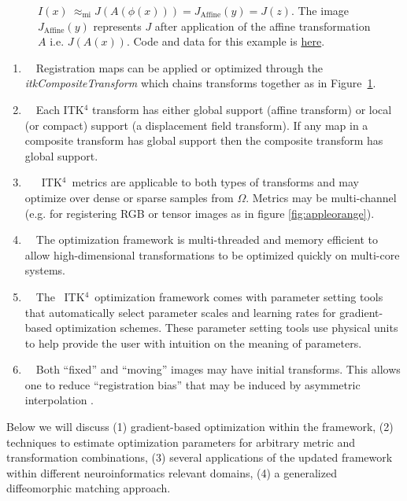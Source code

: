 \documentclass{frontiersSCNS}
\newcommand{\tk}{~ITK$^{\text{4}}$~}
\begin{document}
\begin{figure}[t]
\begin{center}
{  $I(x) ~\approx_\text{mi}  J(A(\phi(x))) =  J_\text{Affine}(y) = J(z)
  $. The image $J_\text{Affine}(y)$
  represents $J$ after application of the affine transformation $A$
  i.e. $J(A(x))$.  Code and data for this example is \href{http://stnava.github.io/cars/}{here}.}
\label{fig:composite}
\end{center}
\end{figure}
\begin{enumerate}
\item~~Registration maps can be applied or optimized through the {\em
    itkCompositeTransform} which chains transforms together as in Figure~\ref{fig:composite}.
\item~~Each ITK$^4$ transform has either global support (affine
  transform) or local (or compact) support (a displacement field transform).   If
  any map in a composite transform has global support then the
  composite transform has global support. 
\item~~\tk metrics are applicable to both types of transforms and may
  optimize over dense or sparse samples from $\Omega$.  Metrics may be
  multi-channel (e.g. for registering RGB or tensor images as in
  figure \ref{fig:appleorange}).
\item~~The optimization framework is multi-threaded and memory
  efficient to allow high-dimensional transformations to be optimized
  quickly on multi-core systems.
\item~~The \tk optimization framework comes with parameter setting tools
  that automatically select parameter scales and learning rates for
  gradient-based optimization schemes.  These parameter setting tools
  use physical units to help provide the user with intuition on the
  meaning of parameters.  
\item~~Both ``fixed'' and ``moving'' images may have initial
  transforms.  This allows one to reduce ``registration bias'' that
  may be induced by asymmetric interpolation \cite{Yushkevich2010a}. 
\end{enumerate}
Below we will discuss (1) gradient-based optimization within the
framework, (2) techniques to estimate optimization parameters for
arbitrary metric and transformation combinations, (3) several
applications of the updated framework within different
neuroinformatics relevant domains, (4) a generalized diffeomorphic
matching approach.
\end{document}
